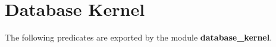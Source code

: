 %
% 
% 
% 
% 


\section{\eclipse Database Kernel}

The following predicates are exported by the module {\bf database\_kernel}.

\label{kernel-sub}

